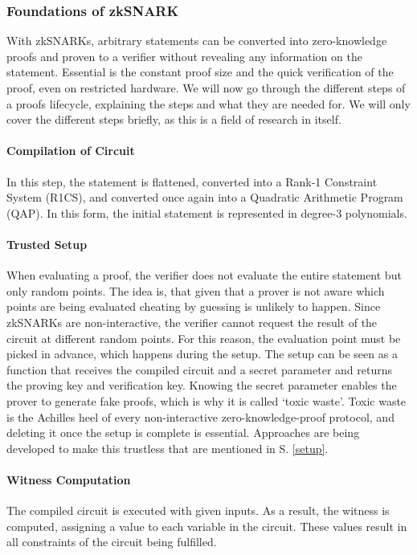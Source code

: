 \documentclass[../../thesis.tex]{subfiles}
\begin{document}
\subsubsection{Foundations of zkSNARK}
With zkSNARKs, arbitrary statements can be converted into zero-knowledge proofs and proven to a verifier without revealing any information on the statement. Essential is the constant proof size and the quick verification of the proof, even on restricted hardware. We will now go through the different steps of a proofs lifecycle, explaining the steps and what they are needed for. We will only cover the different steps briefly, as this is a field of research in itself.

\paragraph{Compilation of Circuit}
In this step, the statement is flattened, converted into a Rank-1 Constraint System (R1CS), and converted once again into a Quadratic Arithmetic Program (QAP). In this form, the initial statement is represented in degree-3 polynomials.

\paragraph{Trusted Setup}
When evaluating a proof, the verifier does not evaluate the entire statement but only random points. The idea is, that given that a prover is not aware which points are being evaluated cheating by guessing is unlikely to happen. Since zkSNARKs are non-interactive, the verifier cannot request the result of the circuit at different random points. For this reason, the evaluation point must be picked in advance, which happens during the setup. The setup can be seen as a function that receives the compiled circuit and a secret parameter and returns the proving key and verification key. Knowing the secret parameter enables the prover to generate fake proofs, which is why it is called `toxic waste'. Toxic waste is the Achilles heel of every non-interactive zero-knowledge-proof protocol, and deleting it once the setup is complete is essential. Approaches are being developed to make this trustless that are mentioned in S. \ref{setup}.

\paragraph{Witness Computation}
The compiled circuit is executed with given inputs. As a result, the witness is computed, assigning a value to each variable in the circuit. These values result in all constraints of the circuit being fulfilled.
\end{document}
